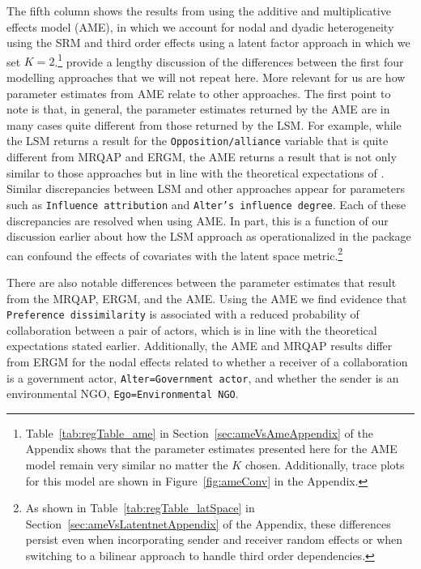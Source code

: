 The fifth column shows the results from using the additive and multiplicative effects model (AME), in which we account for nodal and dyadic heterogeneity using the SRM and third order effects using a latent factor approach in which we set $K=2$.\footnote{Table~\ref{tab:regTable_ame} in Section~\ref{sec:ameVsAmeAppendix} of the Appendix shows that the parameter estimates presented here for the AME model remain very similar no matter the $K$ chosen. Additionally, trace plots for this model are shown in Figure~\ref{fig:ameConv} in the Appendix.} \citet{cranmer:etal:2016} provide a lengthy discussion of the differences between the first four modelling approaches that we will not repeat here. More relevant for us are how parameter estimates from AME relate to other approaches. The first point to note is that, in general, the parameter estimates returned by the AME are in many cases quite different from those returned by the LSM. For example, while the LSM returns a result for the \texttt{Opposition/alliance} variable that is quite different from MRQAP and ERGM, the AME returns a result that is not only similar to those approaches but in line with the theoretical expectations of \citet{ingold:fischer:2014}. Similar discrepancies between LSM and other approaches appear for parameters such as \texttt{Influence attribution} and \texttt{Alter's influence degree}. Each of these discrepancies are resolved when using AME. In part, this is a function of our discussion earlier about how the LSM approach as operationalized in the  package can confound the effects of covariates with the latent space metric.\footnote{As shown in Table~\ref{tab:regTable_latSpace} in Section~\ref{sec:ameVsLatentnetAppendix} of the Appendix, these differences persist even when incorporating sender and receiver random effects or when switching to a bilinear approach to handle third order dependencies.}

There are also notable differences between the parameter estimates that result from the MRQAP, ERGM, and the AME. Using the AME we find evidence that \texttt{Preference dissimilarity} is associated with a reduced probability of collaboration between a pair of actors, which is in line with the theoretical expectations stated earlier. Additionally, the AME and MRQAP results differ from ERGM for the nodal effects related to whether a receiver of a collaboration is a government actor, \texttt{Alter=Government actor}, and whether the sender is an environmental NGO, \texttt{Ego=Environmental NGO}.

